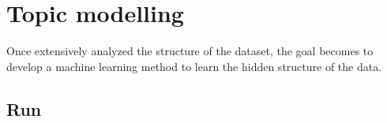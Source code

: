 \chapter{Topic modelling}\label{ch:topicmodelling}
Once extensively analyzed the structure of the dataset, the goal becomes to develop a machine learning method to learn the hidden structure of the data.









\clearpage
\section{Run}\label{sec:run}


\clearpage


\clearpage


\clearpage
